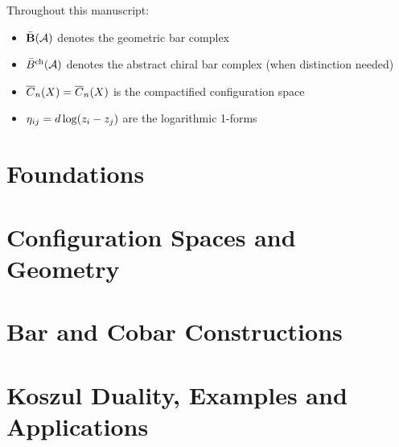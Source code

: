 \documentclass[11pt]{memoir}
\begin{document}
\tableofcontents

\medskip
\noindent

\begin{remark}
Throughout this manuscript:
\begin{itemize}
\item $\bar{\mathbf{B}}(\mathcal{A})$ denotes the geometric bar complex
\item $\bar{B}^{\text{ch}}(\mathcal{A})$ denotes the abstract chiral bar complex (when distinction needed)
\item $\overline{C}_{n}(X) = \overline{C}_n(X)$ is the compactified configuration space
\item $\eta_{ij} = d\log(z_i - z_j)$ are the logarithmic 1-forms
\end{itemize}
\end{remark}

\part{Foundations}



%

\part{Configuration Spaces and Geometry}



\part{Bar and Cobar Constructions}





\part{Koszul Duality, Examples and Applications}
\end{document}
